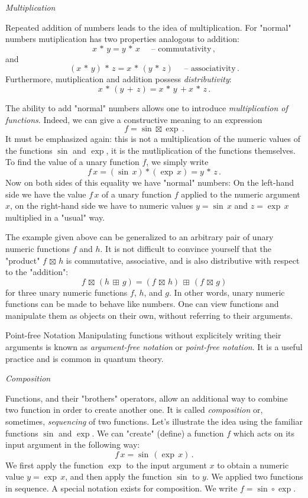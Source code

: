 \begin{flushleft}
	{\it Multiplication}
\end{flushleft}
Repeated addition of numbers leads to the idea of multiplication. For "normal" numbers mutiplication has two properties analogous to addition:
\[
x\,*\, y = y\,*\, x\quad\textrm{ -- commutativity}\,,
\]
and
\[
(x\,*\, y)\,*\, z = x\,*\, (y\,*\, z) \quad\textrm{ -- associativity}\,.
\]
Furthermore, mutiplication and addition possess \emph{distributivity}:
\[
x\,*\, (y\,+\,z)=x\,*\, y\,+x\,*\, z\,.
\]

The ability to add "normal" numbers allows one to introduce \emph{multiplication of functions}. Indeed, we can give a constructive meaning to an expression 
\[
f = \sin\boxtimes\exp\,.
\]
It must be emphasized again: this is not a multiplication of the numeric values of the functions $\sin$ and $\exp$, it is the mutliplication of the functions themselves. 
To find the value of a unary function $f$, we simply write
\[
f\,x=(\sin\,x)*(\exp\,x)=y\,*\, z\,.
\]
Now on both sides of this equality we have "normal" numbers: On the left-hand side we have the value $f\,x$ of a unary function $f$ applied to the numeric argument $x$, on the right-hand side we have to numeric values $y=\sin\,x$ and $z=\exp\,x$ multiplied in a "usual" way.

The example given above can be generalized to an arbitrary pair of unary numeric functions $f$ and $h$. It is not difficult to convince yourself that the "product" $f\,\boxtimes\, h$ is commutative, associative, and is also distributive with respect to the "addition":
\[
f\,\boxtimes\, (h\,\boxplus\, g) = (f\,\boxtimes\, h)\,\boxplus\,(f\,\boxtimes\, g)
\]
for three unary numeric functions $f$, $h$, and $g$. In other words, unary numeric functions can be made to behave like numbers. One can view functions and manipulate them as objects on their own, without referring to their arguments.
\begin{mybio}{Point-free Notation}
	Manipulating functions without explicitely writing their arguments is known as \emph{argument-free notation} or \emph{point-free notation}. It is a useful practice and is common in quantum theory.
\end{mybio}

\begin{flushleft}
	{\it Composition}
\end{flushleft}
Functions, and their "brothers" operators, allow an additional way to combine two function in order to create another one. It is called \emph{composition} or, sometimes, \emph{sequencing} of two functions. Let's illustrate the idea using the familiar functions $\sin$ and $\exp$. We can "create" (define) a function 
$f$ which acts on its input argument in the following way:
\[
f\,x=\sin\,(\exp\, x)\,.
\]
We first apply the function $\exp$ to the input argument $x$ to obtain a numeric value $y=\exp\, x$, and then apply the function $\sin$ to $y$. We applied two functions in sequence. A special notation exists for composition. We write $f = \sin\circ\exp$.

